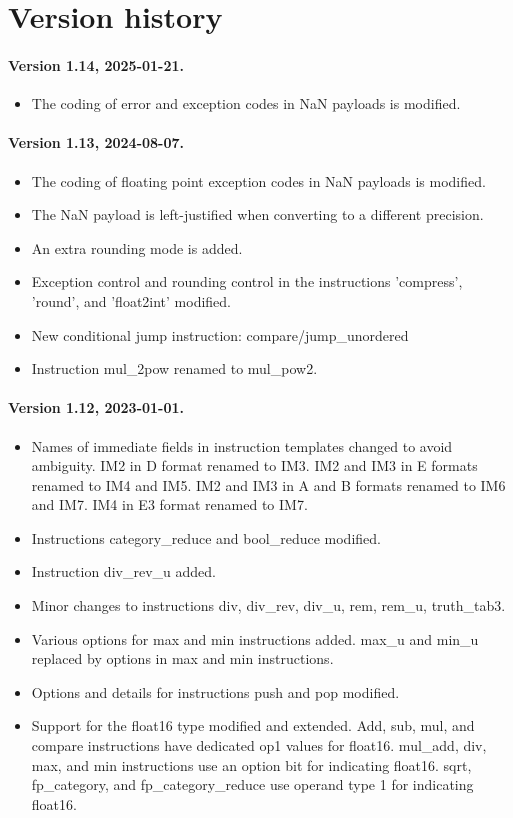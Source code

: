 \documentclass[forwardcom.tex]{subfiles}
\begin{document}
\RaggedRight

\chapter{Version history}


\subsubsection{Version 1.14, 2025-01-21.}
\begin{itemize}
\item The coding of error and exception codes in NaN payloads is modified.
\end{itemize}


\subsubsection{Version 1.13, 2024-08-07.}
\begin{itemize}
\item The coding of floating point exception codes in NaN payloads is modified.
\item The NaN payload is left-justified when converting to a different precision.
\item An extra rounding mode is added.
\item Exception control and rounding control in the instructions 'compress', 'round', and 'float2int' modified.
\item New conditional jump instruction: compare/jump\_unordered
\item Instruction mul\_2pow renamed to mul\_pow2.
\end{itemize}


\subsubsection{Version 1.12, 2023-01-01.}
\begin{itemize}
\item Names of immediate fields in instruction templates changed to avoid ambiguity. IM2 in D format renamed to IM3. IM2 and IM3 in E formats renamed to IM4 and IM5. IM2 and IM3 in A and B formats renamed to IM6 and IM7. IM4 in E3 format renamed to IM7.
\item Instructions category\_reduce and bool\_reduce modified.
\item Instruction div\_rev\_u added.
\item Minor changes to instructions div, div\_rev, div\_u, rem, rem\_u, truth\_tab3.
\item Various options for max and min instructions added. max\_u and min\_u replaced by options in max and min instructions.
\item Options and details for instructions push and pop modified.
\item Support for the float16 type modified and extended. Add, sub, mul, and compare instructions have dedicated op1 values for float16. mul\_add, div, max, and min instructions use an option bit for indicating float16. sqrt, fp\_category, and fp\_category\_reduce use operand type 1 for indicating float16.
\end{itemize}
\end{document}
